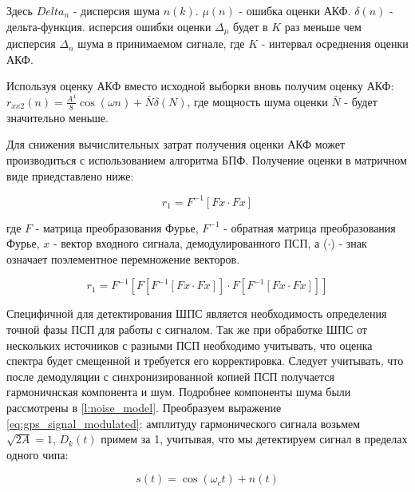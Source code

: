 Здесь ${Delta_n}$ - дисперсия шума ${n(k)}$. ${\mu{(n)}}$ - ошибка оценки АКФ. ${\delta{(n)}}$ - дельта-функция. исперсия ошибки
оценки ${\Delta_{\mu}}$ будет в ${K}$ раз меньше чем дисперсия ${\Delta_n}$ шума в принимаемом сигнале, где ${K}$ - интервал
осреднения оценки АКФ.

Используя оценку АКФ вместо исходной выборки вновь получим оценку АКФ:
${r_{xx2}(n) = \frac{A^4}{8} \cos{(\omega n)} + \bar{N} \delta{(N)}}$,
где мощность шума оценки ${\bar{N}}$ - будет значительно меньше.

Для снижения вычислительных затрат получения оценки АКФ может производиться с использованием алгоритма БПФ. Получение оценки в 
матричном виде приедставлено ниже:

\begin{center}
\begin{equation}
	r_1 = F^{-1}[Fx \cdot Fx]
\end{equation}
\end{center}

где ${F}$ - матрица преобразования Фурье, ${F^{-1}}$ - обратная матрица преобразования Фурье, ${x}$ - вектор входного сигнала,
демодулированного ПСП, а (${\cdot{}}$) - знак означает поэлементное перемножение векторов.

\begin{center}
\begin{equation}
	r_1 = F^{-1} \left[ F\left[F^{-1}\left[Fx \cdot Fx\right]\right] \cdot F\left[F^{-1}\left[Fx \cdot Fx\right]\right] \right]
\end{equation}
\end{center}


Специфичной для детектирования ШПС является необходимость определения точной фазы ПСП
для работы с сигналом. Так же при обработке ШПС от нескольких источников с разными ПСП необходимо учитывать,
что оценка спектра будет смещенной и требуется его корректировка. Следует учитывать, что после демодуляции
с синхронизированной копией ПСП получается гармоничнская компонента и шум. Подробнее компоненты шума были
рассмотрены в \ref{l:noise_model}. Преобразуем выражение \ref{eq:gps_signal_modulated}: амплитуду гармонического
сигнала возьмем ${\sqrt{2A} = 1}$, ${D_k(t)}$ примем за 1, учитывая, что мы детектируем сигнал в пределах одного
чипа:
\begin{center}
\begin{equation}
	\label{eq:lpc_signal}
	s(t) = \cos(\omega_{c}t) + n(t)
\end{equation}
\end{center}

